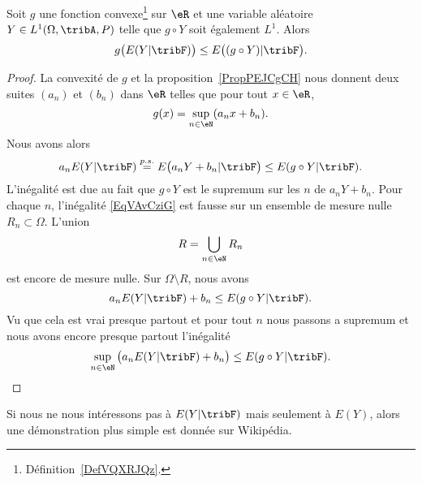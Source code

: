 \begin{proposition}    \label{PropABtKbBo}
	Soit \( g\) une fonction convexe\footnote{Définition~\ref{DefVQXRJQz}.} sur \( \eR\) et une variable aléatoire \( Y\in L^1(\Omega,\tribA,P)\) telle que \( g\circ Y\) soit également \( L^1\). Alors
	\begin{equation}
		g\big( E(Y|\tribF) \big)\leq E\big( (g\circ Y)|\tribF \big).
	\end{equation}
\end{proposition}

\begin{proof}
	La convexité de \( g\) et la proposition~\ref{PropPEJCgCH} nous donnent deux suites \( (a_n)\) et \( (b_n)\) dans \( \eR\) telles que pour tout \( x\in \eR\),
	\begin{equation}
		g(x)=\sup_{n\in \eN}(a_nx+b_n).
	\end{equation}
	Nous avons alors
	\begin{equation}    \label{EqVAvCziG}
		a_nE(Y|\tribF)\stackrel{p.s.}{=}E\big( a_nY+b_n|\tribF \big)\leq  E(g\circ Y|\tribF).
	\end{equation}
	L'inégalité est due au fait que \( g\circ Y\) est le supremum sur les \( n\) de \( a_nY+b_n\). Pour chaque \( n\), l'inégalité \eqref{EqVAvCziG} est fausse sur un ensemble de mesure nulle \( R_n\subset\Omega\). L'union
	\begin{equation}
		R=\bigcup_{n\in \eN}R_n
	\end{equation}
	est encore de mesure nulle. Sur \( \Omega\setminus R\), nous avons
	\begin{equation}
		a_nE(Y|\tribF)+b_n\leq E(g\circ Y|\tribF).
	\end{equation}
	Vu que cela est vrai presque partout et pour tout \( n\) nous passons a supremum et nous avons encore presque partout l'inégalité
	\begin{equation}
		\sup_{n\in\eN}\big( a_nE(Y|\tribF)+b_n \big)\leq E(g\circ Y|\tribF).
	\end{equation}
\end{proof}

Si nous ne nous intéressons pas à \( E(Y|\tribF)\) mais seulement à \( E(Y)\), alors une démonstration plus simple est donnée sur Wikipédia\cite{YMmJevi}.
